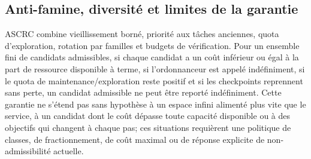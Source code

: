 \documentclass[11pt,a4paper]{article}
\theoremstyle{definition}
\theoremstyle{plain}
\theoremstyle{remark}
\begin{document}
\subsection{Anti-famine, diversité et limites de la garantie}
ASCRC combine vieillissement borné, priorité aux tâches anciennes, quota d'exploration, rotation par familles et budgets de vérification. Pour un ensemble fini de candidats admissibles, si chaque candidat a un coût inférieur ou égal à la part de ressource disponible à terme, si l'ordonnanceur est appelé indéfiniment, si le quota de maintenance/exploration reste positif et si les checkpoints reprennent sans perte, un candidat admissible ne peut être reporté indéfiniment. Cette garantie ne s'étend pas sans hypothèse à un espace infini alimenté plus vite que le service, à un candidat dont le coût dépasse toute capacité disponible ou à des objectifs qui changent à chaque pas; ces situations requièrent une politique de classes, de fractionnement, de coût maximal ou de réponse explicite de non-admissibilité actuelle.
\end{document}
